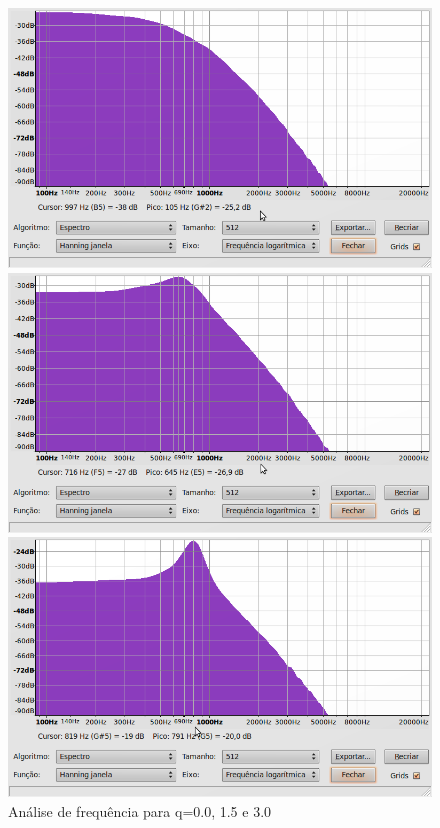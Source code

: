 \documentclass{article}
\begin{document}
\begin{figure}
  \centering
\parbox{1.5in}{
    \centering
    \includegraphics[scale=0.15]{q0.png}
    }%
\qquad	  
\parbox{1.5in}{
      \centering
      \includegraphics[scale=0.15]{q15.png}
      }%
\qquad
\parbox{1.5in}{
      \centering
      \includegraphics[scale=0.15]{q3.png}
      }%

  \caption{Análise de frequência para q=0.0, 1.5 e 3.0}
  \label{fig:qs}
\end{figure}
\end{document}
